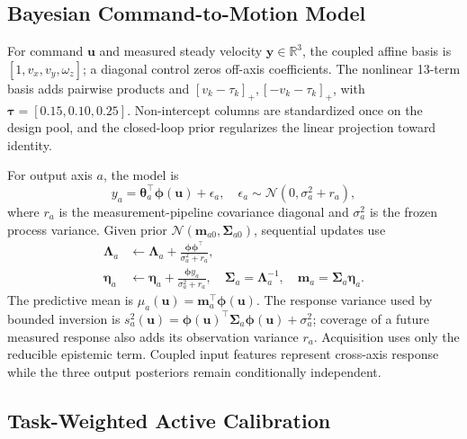 \documentclass[letterpaper,10pt,conference]{ieeeconf}
\newcommand{\vect}[1]{\boldsymbol{#1}}
\begin{document}
\subsection{Bayesian Command-to-Motion Model}

For command $\vect{u}$ and measured steady velocity $\vect{y}\in\mathbb{R}^3$,
the coupled affine basis is $[1,v_x,v_y,\omega_z]$; a diagonal control zeros
off-axis coefficients. The nonlinear 13-term basis adds pairwise products and
$[v_k-\tau_k]_+,[-v_k-\tau_k]_+$, with
$\vect{\tau}=[0.15,0.10,0.25]$. Non-intercept columns are standardized once on
the design pool, and the closed-loop prior regularizes the linear projection
toward identity.

For output axis $a$, the model is
\begin{equation}
 y_a=\vect{\theta}_a^\top\vect{\phi}(\vect{u})+\epsilon_a,
 \quad
 \epsilon_a\sim\mathcal{N}(0,\sigma_a^2+r_a),
 \label{eq:model}
\end{equation}
where $r_a$ is the measurement-pipeline covariance diagonal and $\sigma_a^2$
is the frozen process variance. Given prior
$\mathcal{N}(\vect{m}_{a0},\vect{\Sigma}_{a0})$, sequential updates use
\begin{align}
 \vect{\Lambda}_a &\leftarrow \vect{\Lambda}_a+
 \frac{\vect{\phi}\vect{\phi}^\top}{\sigma_a^2+r_a}, \\
 \vect{\eta}_a &\leftarrow \vect{\eta}_a+
 \frac{\vect{\phi}y_a}{\sigma_a^2+r_a},
 \quad
 \vect{\Sigma}_a=\vect{\Lambda}_a^{-1},\quad
 \vect{m}_a=\vect{\Sigma}_a\vect{\eta}_a .
 \label{eq:update}
\end{align}
The predictive mean is
$\mu_a(\vect{u})=\vect{m}_a^\top\vect{\phi}(\vect{u})$. The response variance
used by bounded inversion is
$s_a^2(\vect{u})=\vect{\phi}(\vect{u})^\top\vect{\Sigma}_a
\vect{\phi}(\vect{u})+\sigma_a^2$; coverage of a future measured response also
adds its observation variance $r_a$. Acquisition uses only the reducible
epistemic term. Coupled input features represent cross-axis response while the
three output posteriors remain conditionally independent.

\subsection{Task-Weighted Active Calibration}
\end{document}
